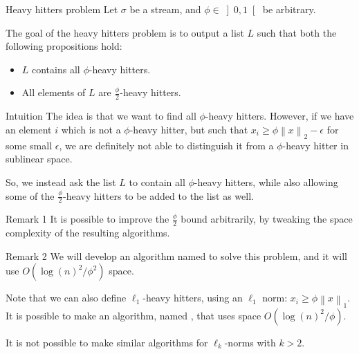 \documentclass[a4paper]{article}
\begin{document}
\begin{parag}{Heavy hitters problem}
    Let $\sigma$ be a stream, and $\phi \in \left]0, 1\right[ $ be arbitrary.

    The goal of the heavy hitters problem is to output a list $L$ such that both the following propositions hold:
    \begin{itemize}
        \item $L$ contains all $\phi$-heavy hitters.
        \item All elements of $L$ are $\frac{\phi}{2}$-heavy hitters.
    \end{itemize}

    \begin{subparag}{Intuition}
        The idea is that we want to find all $\phi$-heavy hitters. However, if we have an element $i$ which is not a $\phi$-heavy hitter, but such that $x_i \geq \phi \left\|x\right\|_2 - \epsilon$ for some small $\epsilon$, we are definitely not able to distinguish it from a $\phi$-heavy hitter in sublinear space.

        So, we instead ask the list $L$ to contain all $\phi$-heavy hitters, while also allowing some of the $\frac{\phi}{2}$-heavy hitters to be added to the list as well. 
    \end{subparag}

    \begin{subparag}{Remark 1}
        It is possible to improve the $\frac{\phi}{2}$ bound arbitrarily, by tweaking the space complexity of the resulting algorithms.
    \end{subparag}

    \begin{subparag}{Remark 2}
        We will develop an algorithm named  to solve this problem, and it will use $O\left(\log\left(n\right)^2 / \phi^2\right)$ space.

        Note that we can also define $\ell_1$-heavy hitters, using an $\ell_1$ norm: $x_i \geq \phi \left\|x\right\|_1$. It is possible to make an algorithm, named , that uses space $O\left(\log\left(n\right)^2 / \phi\right)$.

        It is not possible to make similar algorithms for $\ell_k$-norms with $k > 2$.
    \end{subparag}
\end{parag}
\end{document}
